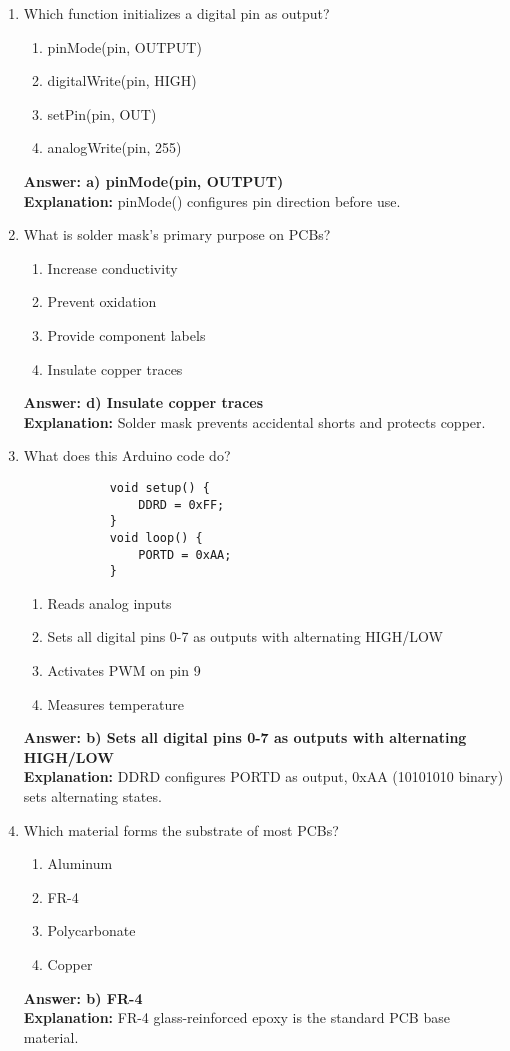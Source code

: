 \documentclass{article}
\begin{document}
\begin{enumerate}
		\item Which function initializes a digital pin as output?
		\begin{enumerate}
			\item pinMode(pin, OUTPUT)
			\item digitalWrite(pin, HIGH)
			\item setPin(pin, OUT)
			\item analogWrite(pin, 255)
		\end{enumerate}
		\textbf{Answer: a) pinMode(pin, OUTPUT)} \\
		\textbf{Explanation:} pinMode() configures pin direction before use.
		
		\item What is solder mask's primary purpose on PCBs?
		\begin{enumerate}
			\item Increase conductivity
			\item Prevent oxidation
			\item Provide component labels
			\item Insulate copper traces
		\end{enumerate}
		\textbf{Answer: d) Insulate copper traces} \\
		\textbf{Explanation:} Solder mask prevents accidental shorts and protects copper.
		
		\item What does this Arduino code do?
		\begin{verbatim}
			void setup() {
				DDRD = 0xFF;
			}
			void loop() {
				PORTD = 0xAA;
			}
		\end{verbatim}
		\begin{enumerate}
			\item Reads analog inputs
			\item Sets all digital pins 0-7 as outputs with alternating HIGH/LOW
			\item Activates PWM on pin 9
			\item Measures temperature
		\end{enumerate}
		\textbf{Answer: b) Sets all digital pins 0-7 as outputs with alternating HIGH/LOW} \\
		\textbf{Explanation:} DDRD configures PORTD as output, 0xAA (10101010 binary) sets alternating states.
		
		\item Which material forms the substrate of most PCBs?
		\begin{enumerate}
			\item Aluminum
			\item FR-4
			\item Polycarbonate
			\item Copper
		\end{enumerate}
		\textbf{Answer: b) FR-4} \\
		\textbf{Explanation:} FR-4 glass-reinforced epoxy is the standard PCB base material.
		

\end{enumerate}
\end{document}
